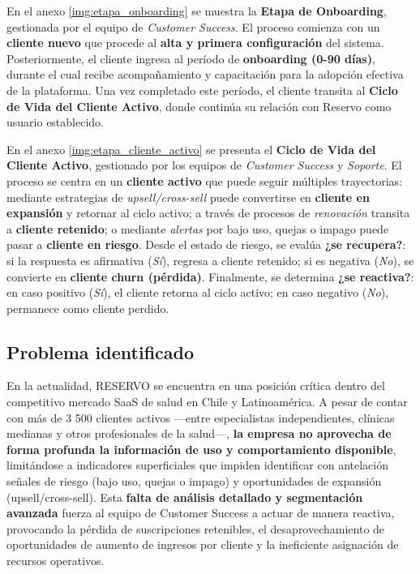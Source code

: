 En el anexo \ref{img:etapa_onboarding} se muestra la \textbf{Etapa de Onboarding}, gestionada por el equipo de \textit{Customer Success}. El proceso comienza con un \textbf{cliente nuevo} que procede al \textbf{alta y primera configuración} del sistema. Posteriormente, el cliente ingresa al período de \textbf{onboarding (0-90 días)}, durante el cual recibe acompañamiento y capacitación para la adopción efectiva de la plataforma. Una vez completado este período, el cliente transita al \textbf{Ciclo de Vida del Cliente Activo}, donde continúa su relación con Reservo como usuario establecido.

En el anexo \ref{img:etapa_cliente_activo} se presenta el \textbf{Ciclo de Vida del Cliente Activo}, gestionado por los equipos de \textit{Customer Success} y \textit{Soporte}. El proceso se centra en un \textbf{cliente activo} que puede seguir múltiples trayectorias: mediante estrategias de \textit{upsell/cross-sell} puede convertirse en \textbf{cliente en expansión} y retornar al ciclo activo; a través de procesos de \textit{renovación} transita a \textbf{cliente retenido}; o mediante \textit{alertas} por bajo uso, quejas o impago puede pasar a \textbf{cliente en riesgo}. Desde el estado de riesgo, se evalúa \textbf{¿se recupera?}: si la respuesta es afirmativa (\textit{Sí}), regresa a cliente retenido; si es negativa (\textit{No}), se convierte en \textbf{cliente churn (pérdida)}. Finalmente, se determina \textbf{¿se reactiva?}: en caso positivo (\textit{Sí}), el cliente retorna al ciclo activo; en caso negativo (\textit{No}), permanece como cliente perdido.

\subsection{Problema identificado}

En la actualidad, RESERVO se encuentra en una posición crítica dentro del competitivo mercado SaaS de salud en Chile y Latinoamérica. A pesar de contar con más de 3 500 clientes activos —entre especialistas independientes, clínicas medianas y otros profesionales de la salud—, \textbf{la empresa no aprovecha de forma profunda la información de uso y comportamiento disponible}, limitándose a indicadores superficiales que impiden identificar con antelación señales de riesgo (bajo uso, quejas o impago) y oportunidades de expansión (upsell/cross-sell). Esta \textbf{falta de análisis detallado y segmentación avanzada} fuerza al equipo de Customer Success a actuar de manera reactiva, provocando la pérdida de suscripciones retenibles, el desaprovechamiento de oportunidades de aumento de ingresos por cliente y la ineficiente asignación de recursos operativos.


